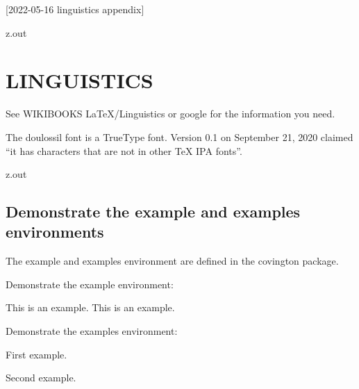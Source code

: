[2022-05-16 linguistics appendix]

\begin{VerbatimOut}{z.out}
\chapter{LINGUISTICS}

See WIKIBOOKS \LaTeX/Linguistics \cite{wikibooks-latex-linguistics}
or google for the information you need.

The doulossil font
\cite{tambe2020}
is a TrueType font.
Version 0.1 on September 21, 2020 claimed
``it has characters that are not in other TeX IPA fonts''.
\end{VerbatimOut}

\MyIO


\begin{VerbatimOut}{z.out}


\section{Demonstrate the example and examples environments}

The example and examples environment
are defined
in the covington
\cite{covington2021}
package.

Demonstrate the example environment:
\begin{example}
  This is an example.
  This is an example.
\end{example}

Demonstrate the examples environment:
\begin{examples}
  \item First example.
  \item Second example.
\end{examples}
\end{VerbatimOut}

\MyIO


  
